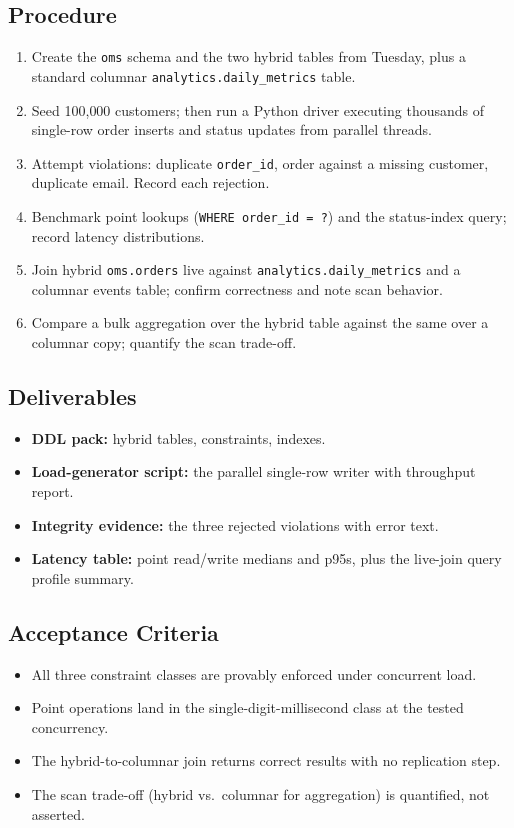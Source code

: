 \subsection*{Procedure}
\begin{enumerate}
    \item Create the \texttt{oms} schema and the two hybrid tables from Tuesday, plus a standard columnar \texttt{analytics.daily\_metrics} table.
    \item Seed 100{,}000 customers; then run a Python driver executing thousands of single-row order inserts and status updates from parallel threads.
    \item Attempt violations: duplicate \texttt{order\_id}, order against a missing customer, duplicate email. Record each rejection.
    \item Benchmark point lookups (\texttt{WHERE order\_id = ?}) and the status-index query; record latency distributions.
    \item Join hybrid \texttt{oms.orders} live against \texttt{analytics.daily\_metrics} and a columnar events table; confirm correctness and note scan behavior.
    \item Compare a bulk aggregation over the hybrid table against the same over a columnar copy; quantify the scan trade-off.
\end{enumerate}

\subsection*{Deliverables}
\begin{itemize}
    \item \textbf{DDL pack:} hybrid tables, constraints, indexes.
    \item \textbf{Load-generator script:} the parallel single-row writer with throughput report.
    \item \textbf{Integrity evidence:} the three rejected violations with error text.
    \item \textbf{Latency table:} point read/write medians and p95s, plus the live-join query profile summary.
\end{itemize}

\subsection*{Acceptance Criteria}
\begin{itemize}
    \item All three constraint classes are provably enforced under concurrent load.
    \item Point operations land in the single-digit-millisecond class at the tested concurrency.
    \item The hybrid-to-columnar join returns correct results with no replication step.
    \item The scan trade-off (hybrid vs.\ columnar for aggregation) is quantified, not asserted.
\end{itemize}

